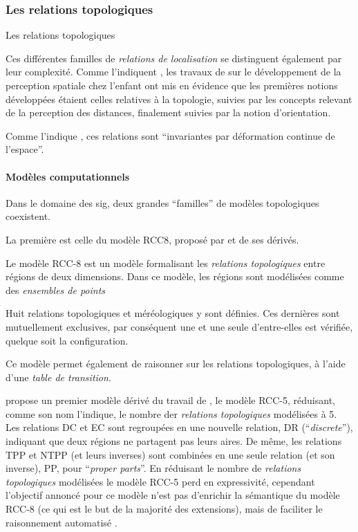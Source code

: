 \subsubsection{Les relations topologiques}

Les relations topologiques 

Ces différentes familles de \emph{relations de localisation} se
distinguent également par leur complexité. Comme l'indiquent
\textcite{Aurnague1997}, les travaux de \textcite{Piaget1948} sur le
développement de la perception spatiale chez l'enfant ont mis en
évidence que les premières notions développées étaient celles
relatives à la topologie, suivies par les concepts relevant de la
perception des distances, finalement suivies par la notion
d'orientation.

Comme l'indique \textcite{Duchene2019}, ces relations sont
\enquote{invariantes par déformation continue de l’espace}.



\paragraph{Modèles computationnels}

Dans le domaine des \ac{sig}, deux grandes \enquote{familles} de
modèles topologiques coexistent.

La première est celle du modèle RCC8, proposé par
\textcite{Randell1992} et de ses dérivés.

Le modèle RCC-8 est un modèle formalisant les \emph{relations
  topologiques} entre régions de deux dimensions. Dans ce modèle, les
régions sont modélisées comme des \emph{ensembles de points}


Huit relations topologiques et méréologiques y sont définies. Ces
dernières sont mutuellement exclusives, par conséquent une et une
seule d'entre-elles est vérifiée, quelque soit la configuration.

Ce modèle permet également de raisonner sur les relations
topologiques, à l'aide d'une \emph{table de transition.}


\textcite{Bennett1994} propose un premier modèle dérivé du travail de
\textcite{Randell1992}, le modèle RCC-5, réduisant, comme son nom
l'indique, le nombre der \emph{relations topologiques} modélisées à
5. Les relations DC et EC sont regroupées en une nouvelle relation, DR
(\enquote{\emph{discrete}}), indiquant que deux régions ne partagent
pas leurs aires. De même, les relations TPP et NTPP (et leurs
inverses) sont combinées en une seule relation (et son inverse), PP,
pour \enquote{\emph{proper parts}}. En réduisant le nombre de
\emph{relations topologiques} modélisées le modèle RCC-5 perd en
expressivité, cependant l'objectif annoncé pour ce modèle n'est pas
d’enrichir la sémantique du modèle RCC-8 (ce qui est le but de la
majorité des extensions), mais de faciliter le raisonnement automatisé
\textcite{Bennett1994}.

